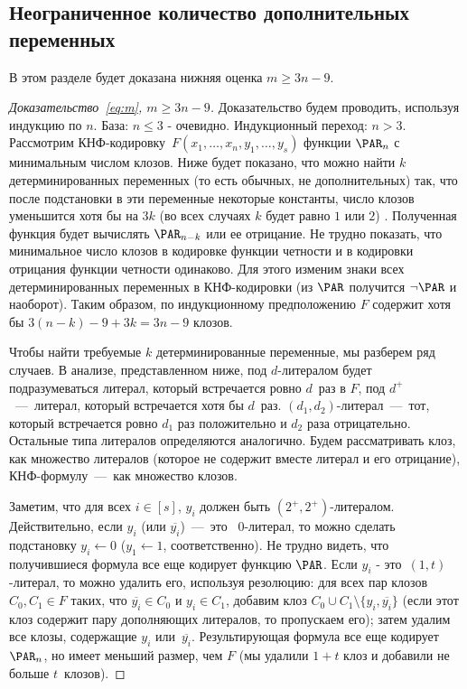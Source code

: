 \subsection{Неограниченное количество дополнительных переменных}
В этом разделе будет доказана нижняя оценка $m \ge 3n-9$.

\begin{proof}[Доказательство~\eqref{eq:m}, $m \ge 3n-9$]
	Доказательство будем проводить, используя индукцию по $n$.
	База: $n \le 3$ - очевидно.
	Индукционный переход: $n>3$. Рассмотрим КНФ-кодировку~$F(x_1, \dotsc, x_n, y_1, \dotsc, y_s)$ функции $\PAR_n$ с минимальным числом клозов. 
	Ниже будет показано, что можно найти $k$ детерминированных переменных (то есть обычных, не дополнительных) так, что после подстановки в эти переменные некоторые константы, число клозов уменьшится хотя бы на $3k$ (во всех случаях $k$ будет равно $1$ или $2$) . 
	Полученная функция будет вычислять $\PAR_{n-k}$ или ее отрицание.
	Не трудно показать, что минимальное число клозов в кодировке функции четности и в кодировки отрицания функции четности одинаково. Для этого изменим знаки всех детерминированных переменных в КНФ-кодировки (из $\PAR$ получится $\neg \PAR$ и наоборот).
	Таким образом, по индукционному предположению $F$ содержит хотя бы $3(n-k)-9+3k=3n-9$ клозов.

	Чтобы найти требуемые $k$ детерминированные переменные, мы разберем ряд случаев. 
	В анализе, представленном ниже, под $d$-литералом будет подразумеваться литерал, который встречается ровно $d$~раз в $F$, под $d^+$~---~литерал, который встречается хотя бы $d$~раз. 
	$(d_1,d_2)$-литерал~---~тот, который встречается ровно $d_1$ раз положительно и $d_2$ раза отрицательно. Остальные типа литералов определяются аналогично. Будем рассматривать клоз, как множество литералов (которое не содержит вместе литерал и его отрицание), КНФ-формулу~---~как множество клозов.
	
	Заметим, что для всех $i \in [s]$, $y_i$ должен быть $(2^+,2^+)$-литералом. Действительно,
	если $y_i$ (или $\overline{y_i}$)~---~это ~$0$-литерал, то можно сделать подстановку $y_i \gets 0$
	($y_1 \gets 1$, соответственно). Не трудно видеть, что получившиеся формула все еще кодирует функцию $\PAR$. 
	Если $y_i$ - это~$(1,t)$-литерал, то можно 	
	удалить его, используя резолюцию: для всех пар клозов $C_0, C_1 \in F$ таких, что
	$\overline{y_i} \in C_0$ и $y_i \in C_1$, добавим клоз $C_0 \cup C_1 \setminus \{y_i, \overline{y_i}\}$ (если этот клоз содержит пару дополняющих литералов, то пропускаем его); затем удалим все клозы, содержащие $y_i$ или~$\overline{y_i}$. Результирующая формула все еще кодирует $\PAR_n$,
	но имеет меньший размер, чем $F$ (мы удалили $1+t$ клоз и добавили не больше $t$~клозов).
	

\end{proof}
